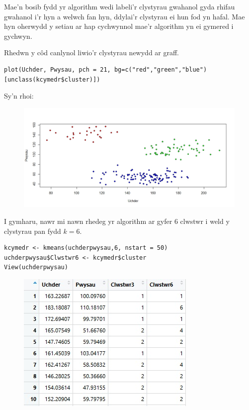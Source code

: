 Mae'n bosib fydd yr algorithm wedi labeli'r clystyrau gwahanol gyda rhifau gwahanol i'r hyn a welwch fan hyn, ddylai'r clystyrau ei hun fod yn hafal. Mae hyn oherwydd y setiau ar hap cychwynnol mae'r algorithm yn ei gymered i gychwyn.

Rhedwn y c\^{o}d canlynol liwio'r clystyrau newydd ar graff.

\begin{verbatim}
plot(Uchder, Pwysau, pch = 21, bg=c("red","green","blue")[unclass(kcymedr$cluster)])
\end{verbatim}

Sy'n rhoi:

\begin{figure}[H]
\begin{center}
\includegraphics[width=0.5\linewidth]{../img/3clwstwrR.jpeg}
\end{center}
\end{figure}

I gymharu, nawr mi nawn rhedeg yr algorithm ar gyfer 6 clwstwr i weld y clystyrau pan fydd $k=6$. 

\begin{verbatim}
kcymedr <- kmeans(uchderpwysau,6, nstart = 50)
uchderpwysau$Clwstwr6 <- kcymedr$cluster
View(uchderpwysau)
\end{verbatim}

\begin{figure}[H]
\begin{center}
\includegraphics[width=0.5\linewidth]{../img/Data6_yn_R.jpg}
\end{center}
\end{figure}

